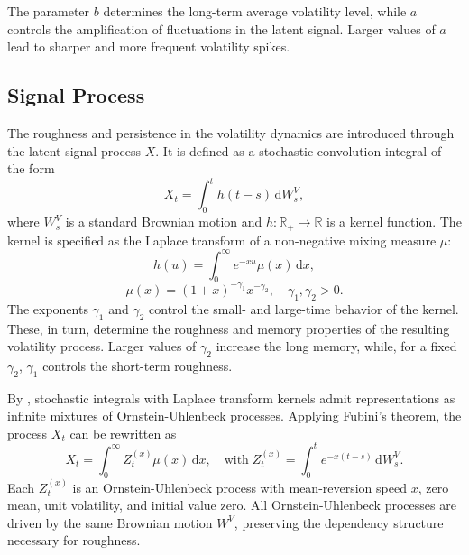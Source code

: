 The parameter $b$ determines the long-term average volatility level, while $a$ controls the amplification of fluctuations in the latent signal. Larger values of $a$ lead to sharper and more frequent volatility spikes.


\subsection{Signal Process} \label{subsec:SignalProcess}

The roughness and persistence in the volatility dynamics are introduced through the latent signal process $X$. It is defined as a stochastic convolution integral of the form
\begin{equation} \label{eq:StochInt}
    X_t = \int_0^t h(t-s) \, \mathrm{d}W_s^V,
\end{equation}
where $W_s^V$ is a standard Brownian motion and $h: \mathbb{R}_+ \to \mathbb{R}$ is a kernel function. The kernel is specified as the Laplace transform of a non-negative mixing measure $\mu$:
\begin{equation} \label{eq:Kernel}
    h(u) = \int_0^{\infty} e^{-x u} \mu(x) \, \mathrm{d}x,
\end{equation}
\begin{equation} \label{eq:Measure}
    \mu(x) = (1+x)^{-\gamma_1} x^{-\gamma_2}, \quad \gamma_1,\gamma_2 > 0.
\end{equation}
The exponents $\gamma_1$ and $\gamma_2$ control the small- and large-time behavior of the kernel. These, in turn, determine the roughness and memory properties of the resulting volatility process. Larger values of $\gamma_2$ increase the long memory, while, for a fixed $\gamma_2$, $\gamma_1$ controls the short-term roughness.

By \citet{CarmonaCoutin1998}, stochastic integrals with Laplace transform kernels admit representations as infinite mixtures of Ornstein-Uhlenbeck processes. Applying Fubini's theorem, the process $X_t$ can be rewritten as
\begin{equation} \label{eq:Signal}
    X_t = \int_0^{\infty} Z_t^{(x)} \mu(x) \, \mathrm{d}x, \quad \text{with}\; Z_t^{(x)} = \int_0^t e^{-x(t-s)} \, \mathrm{d}W_s^V.
\end{equation}
Each $Z_t^{(x)}$ is an Ornstein-Uhlenbeck process with mean-reversion speed $x$, zero mean, unit volatility, and initial value zero. All Ornstein-Uhlenbeck processes are driven by the same Brownian motion $W^V$, preserving the dependency structure necessary for roughness.


